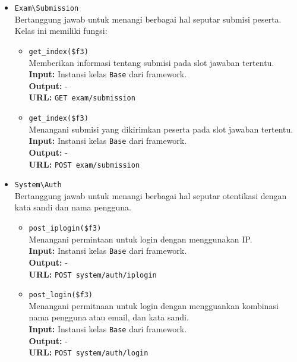 \begin{itemize}
        \item \texttt{Exam\textbackslash Submission} \\
            Bertanggung jawab untuk menangi berbagai hal seputar submisi
            peserta. Kelas ini memiliki fungsi:
            \begin{itemize}
                \item \texttt{get\_index(\$f3)} \\
                    Memberikan informasi tentang submisi pada slot jawaban
                    tertentu. \textbf{Input:} Instansi kelas \texttt{Base} dari
                    framework.\\
                    \textbf{Output:} -\\
                    \textbf{URL:} \texttt{GET exam/submission}
                    
                \item \texttt{get\_index(\$f3)} \\
                    Menangani submisi yang dikirimkan peserta pada slot jawaban
                    tertentu. \textbf{Input:} Instansi kelas \texttt{Base} dari
                    framework.\\
                    \textbf{Output:} -\\
                    \textbf{URL:} \texttt{POST exam/submission}
            \end{itemize}
            
        \item \texttt{System\textbackslash Auth} \\
            Bertanggung jawab untuk menangi berbagai hal seputar otentikasi
            dengan kata sandi dan nama pengguna.
            \begin{itemize}
                \item \texttt{post\_iplogin(\$f3)}\\
                    Menangani permintaan untuk login dengan menggunakan IP.\\
                    \textbf{Input:} Instansi kelas \texttt{Base} dari
                    framework.\\
                    \textbf{Output:} -\\
                    \textbf{URL:} \texttt{POST system/auth/iplogin}
                
                \item \texttt{post\_login(\$f3)}\\
                    Menangani permitnaan untuk login dengan mengguankan
                    kombinasi nama pengguna atau email, dan kata sandi.\\
                    \textbf{Input:} Instansi kelas \texttt{Base} dari
                    framework.\\
                    \textbf{Output:} -\\
                    \textbf{URL:} \texttt{POST system/auth/login}
            \end{itemize}


\end{itemize}
